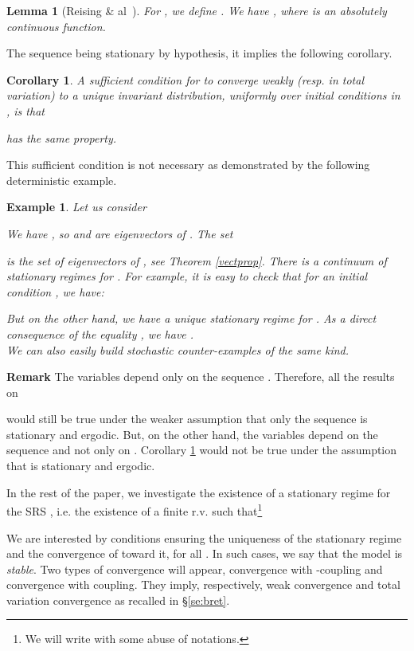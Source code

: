 \documentclass[11pt,titlepage]{article}
\newcommand{\parag}{\medskip\noindent}
\newtheorem{lemm}[theo]{Lemma }
\newtheorem{coro}[theo]{Corollary}
\newtheorem{example}[theo]{Example }
\newenvironment{exam}{\begin{example}\rm}{\end{example}}
\begin{document}
\begin{lemm}[Reising \& al~\cite{Ral90}]
For , we define . 
We have , where  is an absolutely 
continuous function.
\end{lemm} 

The sequence  being stationary by hypothesis,
it implies the following corollary. 

\begin{coro}
A sufficient condition for  to
converge weakly (resp. in total variation) to a unique
invariant 
distribution, uniformly over initial conditions in , is that
 
has the same property.
\label{co:co}
\end{coro}

This sufficient condition is not necessary as  demonstrated by the
following 
deterministic example.
\begin{exam}
\label{ex:det}
Let us consider 

We have , so  and  are eigenvectors of . 
The set  

is the set of eigenvectors
of , see Theorem \ref{vectprop}. There is a continuum of stationary regimes
for 
. For example, it is easy to check that for an initial condition
, we have:  

But on the other hand, we have a unique stationary regime for . As a direct consequence of the equality , we have
. \\
We can also easily build stochastic counter-examples of the same kind.
\end{exam}

{\bf Remark } The variables  depend only on the sequence
.
Therefore,
all the results on 
 
would still be true under the weaker assumption that 
only the sequence  is stationary and ergodic. But, on the other
hand, the variables  depend on the sequence  and not only
on . Corollary \ref{co:co} would not be true under
the assumption that  is stationary and ergodic.
 
\parag

In the rest of the paper, 
we investigate the existence of a stationary regime for the SRS
, i.e. the existence of a finite r.v. 
  such that\footnote{We will write
 with some abuse of notations.} 

We are interested by conditions
ensuring the uniqueness of the stationary regime and the convergence
of  toward it, for all . In such cases, we say
that the model is {\it stable}. Two types of
convergence will appear, convergence with -coupling and convergence with
coupling. They imply, respectively, weak convergence and total
variation convergence as recalled in \S \ref{se:bret}. 
\end{document}
